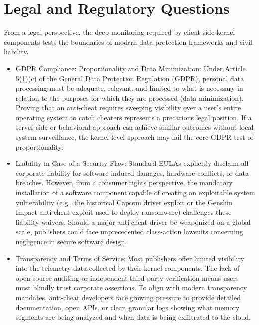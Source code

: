 \section{Legal and Regulatory Questions}

From a legal perspective, the deep monitoring required by client-side kernel components tests the boundaries of modern data protection frameworks and civil liability.

\begin{itemize}
\item GDPR Compliance: Proportionality and Data Minimization: Under Article 5(1)(c) of the General Data Protection Regulation (GDPR), personal data processing must be adequate, relevant, and limited to what is necessary in relation to the purposes for which they are processed (data minimization). Proving that an anti-cheat requires sweeping visibility over a user's entire operating system to catch cheaters represents a precarious legal position. If a server-side or behavioral approach can achieve similar outcomes without local system surveillance, the kernel-level approach may fail the core GDPR test of proportionality.
\item Liability in Case of a Security Flaw: Standard EULAs explicitly disclaim all corporate liability for software-induced damages, hardware conflicts, or data breaches. However, from a consumer rights perspective, the mandatory installation of a software component capable of creating an exploitable system vulnerability (e.g., the historical Capcom driver exploit or the Genshin Impact anti-cheat exploit used to deploy ransomware) challenges these liability waivers. Should a major anti-cheat driver be weaponized on a global scale, publishers could face unprecedented class-action lawsuits concerning negligence in secure software design.
\item Transparency and Terms of Service: Most publishers offer limited visibility into the telemetry data collected by their kernel components. The lack of open-source auditing or independent third-party verification means users must blindly trust corporate assertions. To align with modern transparency mandates, anti-cheat developers face growing pressure to provide detailed documentation, open APIs, or clear, granular logs showing what memory segments are being analyzed and when data is being exfiltrated to the cloud.
\end{itemize}
